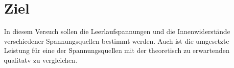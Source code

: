 \section{Ziel}
In diesem Versuch sollen die Leerlaufspannungen und die Innenwiderstände
verschiedener Spannungsquellen bestimmt werden. Auch ist die umgesetzte Leistung
für eine der Spannungsquellen mit der theoretisch zu erwartenden qualitatv zu
vergleichen.
\label{sec:Ziel}
